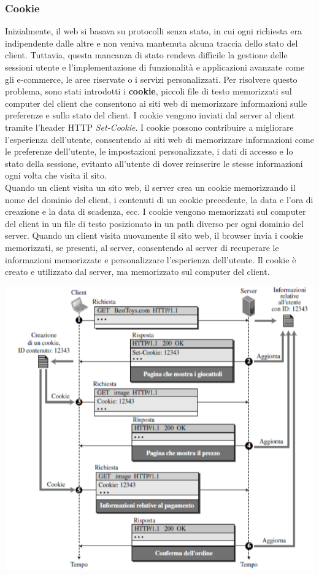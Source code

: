 \documentclass[12pt]{report}
\begin{document}
	\subsubsection{Cookie}
	Inizialmente, il web si basava su protocolli senza stato, in cui ogni richiesta era indipendente dalle altre e non veniva mantenuta alcuna traccia dello stato del client. Tuttavia, questa mancanza di stato rendeva difficile la gestione delle sessioni utente e l'implementazione di funzionalità e applicazioni avanzate come gli e-commerce, le aree riservate o i servizi personalizzati. Per risolvere questo problema, sono stati introdotti i \textbf{cookie}, piccoli file di testo memorizzati sul computer del client che consentono ai siti web di memorizzare informazioni sulle preferenze e sullo stato del client. I cookie vengono inviati dal server al client tramite l'header HTTP \textit{Set-Cookie}. I cookie possono contribuire a migliorare l'esperienza dell'utente, consentendo ai siti web di memorizzare informazioni come le preferenze dell'utente, le impostazioni personalizzate, i dati di accesso e lo stato della sessione, evitanto all'utente di dover reinserire le stesse informazioni ogni volta che visita il sito. 
	\vspace{\baselineskip}\\
	Quando un client visita un sito web, il server crea un cookie memorizzando il nome del dominio del client, i contenuti di un cookie precedente, la data e l'ora di creazione e la data di scadenza, ecc. I cookie vengono memorizzati sul computer del client in un file di testo posizionato in un path diverso per ogni dominio del server. Quando un client visita nuovamente il sito web, il browser invia i cookie memorizzati, se presenti, al server, consentendo al server di recuperare le informazioni memorizzate e personalizzare l'esperienza dell'utente. Il cookie è creato e utilizzato dal server, ma memorizzato sul computer del client.
	\begin{center}
		\includegraphics[scale=0.5]{assets/cookie.png}	
	\end{center}
\end{document}
